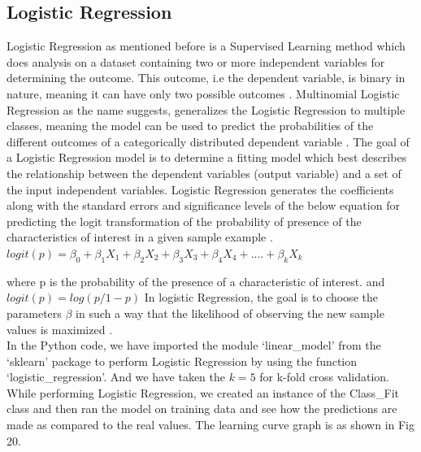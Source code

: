 \subsection{Logistic Regression}
Logistic Regression as mentioned before is a Supervised Learning method which does analysis on a dataset containing two or more independent variables for determining the outcome. This outcome, i.e the dependent variable, is binary in nature, meaning it can have only two possible outcomes \cite{link10}. Multinomial Logistic Regression as the name suggests, generalizes the Logistic Regression to multiple classes, meaning the model can be used to predict the probabilities of the different outcomes of a categorically distributed dependent variable \cite{link111}. The goal of a Logistic Regression model is to determine a fitting model which best describes the relationship between the dependent variables (output variable) and a set of the input independent variables. Logistic Regression generates the coefficients along with the standard errors and significance levels of the below equation for predicting the logit transformation of the probability of presence of the characteristics of interest in a given sample example \cite{link10}. \\

$logit(p) = \beta_0 + \beta_1X_1 + \beta_2X_2 +\beta_3X_3 + \beta_4X_4 + .... + \beta_kX_k$

where p is the probability of the presence of a characteristic of interest.
and $logit(p) = log(p/1-p)$
In logistic Regression, the goal is to choose the parameters $\beta$ in such a way that the likelihood of observing the new sample values is maximized \cite{link10}.\\
In the Python code, we have imported the module `linear\_model' from the `sklearn' package to perform Logistic Regression by using the function `logistic\_regression'. And we have taken the $k=5$ for k-fold cross validation. While performing Logistic Regression, we created an instance of the Class\_Fit class and then ran the model on training data and see how the predictions are made as compared to the real values. The learning curve graph is as shown in Fig 20.

